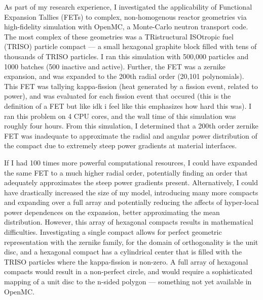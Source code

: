 \documentclass[12pt]{letter}
\begin{document}
As part of my research experience, I investigated the applicability of Functional Expansion Tallies (FETs) to complex, non-homogenous reactor geometries via high-fidelity simulation with OpenMC, a Monte-Carlo neutron transport code. The most complex of these geometries was a TRistructural ISOtropic fuel (TRISO) particle compact --- a small hexagonal graphite block filled with tens of thousands of TRISO particles. I ran this simulation with 500,000 particles and 1000 batches (500 inactive and active). Further, the FET was a zernike expansion, and was expanded to the 200th radial order (20,101 polynomials). This FET was tallying kappa-fission (heat generated by a fission event, related to power), and was evaluated for each fission event that occured (this is the definition of a FET but like idk i feel like this emphasizes how hard this was). I ran this problem on 4 CPU cores, and the wall time of this simulation was roughly four hours. From this simulation, I determined that a 200th order zernike FET was inadequate to approximate the radial and angular power distribution of the compact due to extremely steep power gradients at material interfaces. 

If I had 100 times more powerful computational resources, I could have expanded the same FET to a much higher radial order, potentially finding an order that adequately approximates the steep power gradients present. Alternatively, I could have drastically increased the size of my model, introducing many more compacts and expanding over a full array and potentially reducing the affects of hyper-local power dependences on the expansion, better approximating the mean distribution. However, this array of hexagonal compacts results in mathematical difficulties. Investigating a single compact allows for perfect geometric representation with the zernike family, for the domain of orthogonality is the unit disc, and a hexagonal compact has a cylindrical center that is filled with the TRISO particles where the kappa-fission is non-zero. A full array of hexagonal compacts would result in a non-perfect circle, and would require a sophisticated mapping of a unit disc to the n-sided polygon --- something not yet available in OpenMC.
\end{document}
